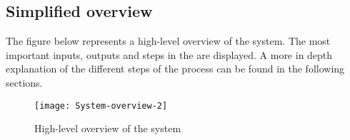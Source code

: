 \subsection{Simplified overview}
The figure below represents a high-level overview of the system. The most important inputs, outputs and steps in the are displayed. A more in depth explanation of the different steps of the process can be found in the following sections.
\begin{figure}[h]
\centering
\texttt{[image: System-overview-2]}
\caption{High-level overview of the system}
\label{fig:overview}
\end{figure}